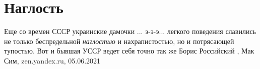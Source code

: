  
 
 
 
 
\chapter{Наглость}
\label{sec:slova.naglost}

Еще со времен СССР украинские дамочки ... э-э-э... легкого поведения славились
не только беспредельной \emph{наглостью} и нахрапистостью, но и потрясающей
тупостью.  Вот и бывшая УССР ведет себя точно так же
Борис Российский
, 
Мак Сим, zen.yandex.ru, 05.06.2021

